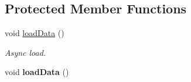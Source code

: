 \subsection*{Protected Member Functions}
\begin{DoxyCompactItemize}
\item 
\mbox{\label{classcocostudio_1_1DataReaderHelper_a17864b210bc3cdd39091ab0f3a4a8bd3}} 
void \hyperlink{classcocostudio_1_1DataReaderHelper_a17864b210bc3cdd39091ab0f3a4a8bd3}{load\+Data} ()
\begin{DoxyCompactList}\small\item\em Async load. \end{DoxyCompactList}\item 
\mbox{\label{classcocostudio_1_1DataReaderHelper_a17864b210bc3cdd39091ab0f3a4a8bd3}} 
void {\bfseries load\+Data} ()
\end{DoxyCompactItemize}
